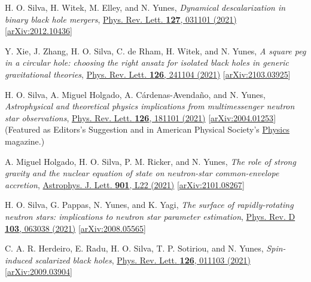 \documentclass[11pt]{article}
\begin{document}
\begin{etaremune}[
        start=\value{pubCounter},
        topsep=0pt,
        partopsep=0pt]
    \item H. O. Silva, H. Witek, M. Elley, and N. Yunes,
    \emph{Dynamical descalarization in binary black hole mergers},
    \href{https://journals.aps.org/prl/abstract/10.1103/PhysRevLett.127.031101}{Phys. Rev. Lett. {\bf 127}, 031101 (2021)}
    [\href{https://arxiv.org/abs/2012.10436}{arXiv:2012.10436}]

    \item Y. Xie, J. Zhang, H. O. Silva, C. de Rham, H. Witek, and N. Yunes,
    \emph{A square peg in a circular hole: choosing the right ansatz for isolated black holes in generic gravitational theories},
    \href{https://journals.aps.org/prl/abstract/10.1103/PhysRevLett.126.241104}{Phys. Rev. Lett. {\bf 126}, 241104 (2021)}
    [\href{https://arxiv.org/abs/2103.03925}{arXiv:2103.03925}]

    \item H. O. Silva, A. Miguel Holgado, A. C\'{a}rdenas-Avenda\~{n}o, and N. Yunes,
    \emph{Astrophysical and theoretical physics implications from multimessenger neutron star observations},
    \href{https://journals.aps.org/prl/abstract/10.1103/PhysRevLett.126.181101}{Phys. Rev. Lett. {\bf 126}, 181101 (2021)}
    [\href{https://arxiv.org/abs/2004.01253}{arXiv:2004.01253}]\\
    (Featured as {\color{venetianred}\sc Editors's Suggestion} and in American Physical Society's \href{https://physics.aps.org/articles/v14/66}{Physics} magazine.)
    \label{pub:SilvaPRL2021Nicer}

    \item A. Miguel Holgado, H. O. Silva, P. M. Ricker, and N. Yunes,
    \emph{The role of strong gravity and the nuclear equation of state on neutron-star common-envelope accretion},
    \href{https://iopscience.iop.org/article/10.3847/2041-8213/abecdd}{Astrophys. J. Lett. {\bf 901}, L22 (2021)}
    [\href{https://arxiv.org/abs/2102.08267}{arXiv:2101.08267}]

    \item H. O. Silva, G. Pappas, N. Yunes, and K. Yagi,
    \emph{The surface of rapidly-rotating neutron stars: implications to neutron star parameter estimation},
    \href{https://journals.aps.org/prd/abstract/10.1103/PhysRevD.103.063038}{Phys. Rev. D {\bf 103}, 063038 (2021)}
    [\href{https://arxiv.org/abs/2008.05565}{arXiv:2008.05565}]

    \item C. A. R. Herdeiro, E. Radu, H. O. Silva, T. P. Sotiriou, and N. Yunes,
    \emph{Spin-induced scalarized black holes},
    \href{https://journals.aps.org/prl/abstract/10.1103/PhysRevLett.126.011103}{Phys. Rev. Lett. {\bf 126}, 011103 (2021)}
    [\href{https://arxiv.org/abs/2009.03904}{arXiv:2009.03904}]


\end{etaremune}
\end{document}
